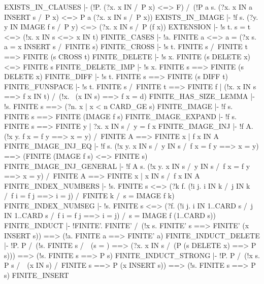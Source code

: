 \ENDTHEOREM
\THEOREM EXISTS\_IN\_CLAUSES
  |- (!P. (?x. x IN {} /\ P x) <=> F) /\
     (!P a s. (?x. x IN a INSERT s /\ P x) <=> P a \/ (?x. x IN s /\ P x))
\ENDTHEOREM
\THEOREM EXISTS\_IN\_IMAGE
  |- !f s. (?y. y IN IMAGE f s /\ P y) <=> (?x. x IN s /\ P (f x))
\ENDTHEOREM
\THEOREM EXTENSION
  |- !s t. s = t <=> (!x. x IN s <=> x IN t)
\ENDTHEOREM
\THEOREM FINITE\_CASES
  |- !a. FINITE a <=> a = {} \/ (?x s. a = x INSERT s /\ FINITE s)
\ENDTHEOREM
\THEOREM FINITE\_CROSS
  |- !s t. FINITE s /\ FINITE t ==> FINITE (s CROSS t)
\ENDTHEOREM
\THEOREM FINITE\_DELETE
  |- !s x. FINITE (s DELETE x) <=> FINITE s
\ENDTHEOREM
\THEOREM FINITE\_DELETE\_IMP
  |- !s x. FINITE s ==> FINITE (s DELETE x)
\ENDTHEOREM
\THEOREM FINITE\_DIFF
  |- !s t. FINITE s ==> FINITE (s DIFF t)
\ENDTHEOREM
\THEOREM FINITE\_FUNSPACE
  |- !s t.
         FINITE s /\ FINITE t
         ==> FINITE
             {f | (!x. x IN s ==> f x IN t) /\ (!x. ~(x IN s) ==> f x = d)}
\ENDTHEOREM
\THEOREM FINITE\_HAS\_SIZE\_LEMMA
  |- !s. FINITE s ==> (?n. {x | x < n} CARD_GE s)
\ENDTHEOREM
\THEOREM FINITE\_IMAGE
  |- !f s. FINITE s ==> FINITE (IMAGE f s)
\ENDTHEOREM
\THEOREM FINITE\_IMAGE\_EXPAND
  |- !f s. FINITE s ==> FINITE {y | ?x. x IN s /\ y = f x}
\ENDTHEOREM
\THEOREM FINITE\_IMAGE\_INJ
  |- !f A. (!x y. f x = f y ==> x = y) /\ FINITE A ==> FINITE {x | f x IN A}
\ENDTHEOREM
\THEOREM FINITE\_IMAGE\_INJ\_EQ
  |- !f s.
         (!x y. x IN s /\ y IN s /\ f x = f y ==> x = y)
         ==> (FINITE (IMAGE f s) <=> FINITE s)
\ENDTHEOREM
\THEOREM FINITE\_IMAGE\_INJ\_GENERAL
  |- !f A s.
         (!x y. x IN s /\ y IN s /\ f x = f y ==> x = y) /\ FINITE A
         ==> FINITE {x | x IN s /\ f x IN A}
\ENDTHEOREM
\THEOREM FINITE\_INDEX\_NUMBERS
  |- !s. FINITE s <=>
         (?k f.
              (!i j. i IN k /\ j IN k /\ f i = f j ==> i = j) /\
              FINITE k /\
              s = IMAGE f k)
\ENDTHEOREM
\THEOREM FINITE\_INDEX\_NUMSEG
  |- !s. FINITE s <=>
         (?f. (!i j. i IN 1..CARD s /\ j IN 1..CARD s /\ f i = f j ==> i = j) /\
              s = IMAGE f (1..CARD s))
\ENDTHEOREM
\THEOREM FINITE\_INDUCT
  |- !FINITE'. FINITE' {} /\ (!x s. FINITE' s ==> FINITE' (x INSERT s))
               ==> (!a. FINITE a ==> FINITE' a)
\ENDTHEOREM
\THEOREM FINITE\_INDUCT\_DELETE
  |- !P. P {} /\
         (!s. FINITE s /\ ~(s = {})
              ==> (?x. x IN s /\ (P (s DELETE x) ==> P s)))
         ==> (!s. FINITE s ==> P s)
\ENDTHEOREM
\THEOREM FINITE\_INDUCT\_STRONG
  |- !P. P {} /\ (!x s. P s /\ ~(x IN s) /\ FINITE s ==> P (x INSERT s))
         ==> (!s. FINITE s ==> P s)
\ENDTHEOREM
\THEOREM FINITE\_INSERT
